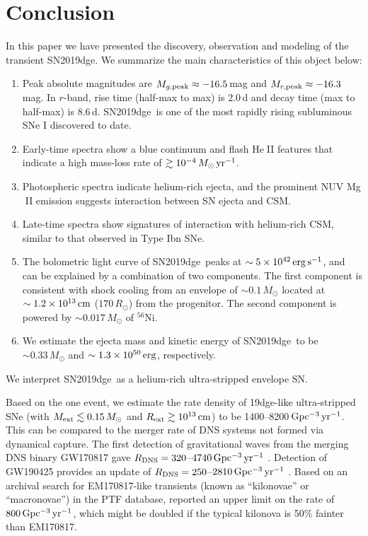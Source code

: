 \documentclass[twocolumn]{aastex63}
\newcommand{\name}{SN2019dge}
\def\ion#1#2{#1$\;${\footnotesize\rm{#2}}\relax}
\begin{document}
\section{Conclusion} \label{sec:conclusion}
In this paper we have presented the discovery, observation and modeling of the transient \name. We 
summarize the main characteristics of this object below:
\begin{enumerate}[label=(\alph*)]
	\item Peak absolute magnitudes are $M_{g\rm , peak}\approx -16.5$\,mag and $M_{r \rm ,peak } 
	\approx -16.3$\,mag. In $r$-band, rise time (half-max to max) is 2.0\,d and decay time (max to 
	half-max) is 8.6\,d. \name\ is one of the most rapidly rising subluminous SNe I discovered to date.
	\item Early-time spectra show a blue continuum and flash \ion{He}{II} features that indicate a 
	high mass-loss rate of $\gtrsim 10^{-4}\, M_\odot \, \rm yr^{-1}$.
	\item Photospheric spectra indicate helium-rich ejecta, and the prominent NUV \ion{Mg}{II} 
	emission suggests interaction between SN ejecta and CSM.
	\item Late-time spectra show signatures of interaction with helium-rich CSM, similar to that observed 
	in Type Ibn SNe.
	\item The bolometric light curve of \name\ peaks at $\sim 5 \times 10^{42}\,{\rm erg\, s^{-1}}$, 
	and can be explained by a combination of two components. The first component is consistent 
	with shock cooling from an envelope of $\sim 0.1\,M_\odot$ located at {\color{red}$\sim 1.2\times 
	10^{13}\, \rm cm$ ($170\, R_\odot$)} from the progenitor. The second component is powered by 
	$\sim 0.017\, M_\odot$ of $^{56}$Ni.
	\item We estimate the ejecta mass and kinetic energy of \name\ to be {\color{red}$\sim 
	0.33\,M_\odot$}	and $\sim1.3\times10^{50}\,{\rm erg}$, respectively.
\end{enumerate}
We interpret \name\ as a helium-rich ultra-stripped envelope SN. 

Based on the one event, we estimate the rate density of 19dge-like ultra-stripped SNe (with $M_{\rm 
ext}\lesssim 0.15\,M_\odot$ and {\color{red}$R_{\rm ext}\gtrsim 10^{13}\,{\rm cm}$}) to be 
1400--8200\,${\rm Gpc^{-3}\, yr^{-1}}$. This can be compared to the merger rate of DNS systems 
not formed via dynamical capture. The first detection of gravitational waves from the merging DNS 
binary GW170817 gave $R_{\rm DNS}=320$--$4740\,{\rm Gpc^{-3}\, yr^{-1}}$ \citep{GW170817}. 
Detection of GW190425 provides an update of $R_{\rm DNS}=250$--$2810\,{\rm Gpc^{-3}\, yr^{-1}}$ 
\citep{GW190425}. Based on an archival search for EM170817-like transients (known as ``kilonovae'' or 
``macronovae'') in the PTF database, \citet{Kasliwal2017} reported an upper limit on the rate of 
$800\,{\rm Gpc^{-3}\, yr^{-1}}$, which might be doubled if the typical kilonova is 50\% fainter than 
EM170817. 
\end{document}
